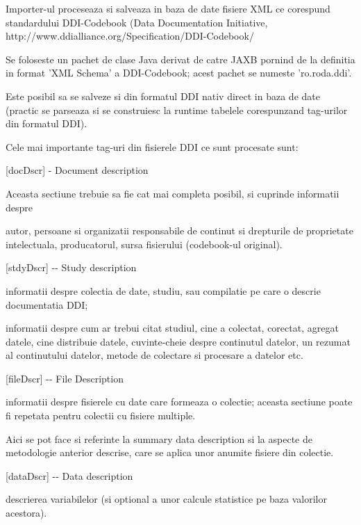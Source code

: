 \documentclass[a4paper, 10pt]{article}
\begin{document}
{\bigskip

Importer-ul proceseaza si salveaza in baza de date fisiere XML ce corespund standardului DDI-Codebook (Data Documentation Initiative, http://www.ddialliance.org/Specification/DDI-Codebook/


\bigskip

Se foloseste un pachet de clase Java derivat de catre JAXB pornind de la definitia in format 'XML Schema' a DDI-Codebook; acest pachet se numeste 'ro.roda.ddi'.

Este posibil sa se salveze si din formatul DDI nativ direct in baza de date (practic se parseaza si se construiesc la runtime tabelele corespunzand tag-urilor din formatul DDI).


\bigskip

Cele mai importante tag-uri din fisierele DDI ce sunt procesate sunt:


\bigskip

[docDscr] - Document description

Aceasta sectiune trebuie sa fie cat mai completa posibil, si cuprinde informatii despre

autor, persoane si organizatii responsabile de continut si drepturile de proprietate intelectuala, producatorul, sursa fisierului (codebook-ul original).


\bigskip

[stdyDscr] -{}- Study description

informatii despre colectia de date, studiu, sau compilatie pe care o descrie documentatia DDI;

informatii despre cum ar trebui citat studiul, cine a colectat, corectat, agregat datele, cine distribuie datele, cuvinte-cheie despre continutul datelor, un rezumat al continutului datelor, metode de colectare si procesare a datelor etc.


\bigskip

[fileDscr] -{}- File Description

informatii despre fisierele cu date care formeaza o colectie; aceasta sectiune poate fi repetata pentru colectii cu fisiere multiple.

Aici se pot face si referinte la {\textquotedbl}summary data description{\textquotedbl} si la aspecte de metodologie anterior descrise, care se aplica unor anumite fisiere din colectie.


\bigskip

[dataDscr] -{}- Data description

descrierea variabilelor (si optional a unor calcule statistice pe baza valorilor acestora).


}
\end{document}
